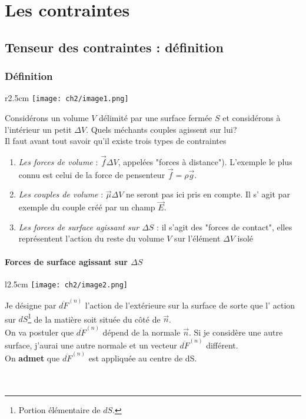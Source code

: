 
\chapter{Les contraintes}
\label{chap:ch2}

\section{Tenseur des contraintes : définition}
\subsection{Définition}
\begin{wrapfigure}[7]{r}{2.5cm}
	\texttt{[image: ch2/image1.png]}
\end{wrapfigure}
Considérons un volume $V$ délimité par une surface fermée $S$ et considérons à l'intérieur un petit
$\Delta V$. Quels méchants couples agissent sur lui?\\
Il faut avant tout savoir qu'il existe trois types de contraintes
    
\begin{enumerate}
	\item \textit{Les forces de volume} : $\vec f \Delta V$, appelées "forces à distance"). L'exemple le
	      plus connu est celui de la force de pensenteur $\vec f = \rho \vec{g}$.
	\item \textit{Les couples de volume} : $\vec{\mu}\Delta V$ ne seront pas ici pris en compte. Il s'
	      agit par exemple du couple créé par un champ $\vec{E}$.
	\item \textit{Les forces de surface agissant sur $\Delta S$} : il s'agit des "forces de contact", 
	      elles représentent l'action du reste du volume $V$ sur l'élément $\Delta V$ isolé
\end{enumerate}
        
        
\subsubsection{Forces de surface agissant sur $\Delta S$}
\begin{wrapfigure}[5]{l}{2.5cm}
	\texttt{[image: ch2/image2.png]}
\end{wrapfigure}
Je désigne par $\overline{dF}^{(n)}$ l'action de l'extérieure sur la surface de sorte que l'
action sur $dS$\footnote{Portion élémentaire de $dS$.} de la matière soit située du côté de 
$\vec{n}$.\\
On va postuler que $\overline{dF}^{(n)}$ dépend de la normale $\vec{n}$. Si je considère une 
autre surface, j'aurai une autre normale et un vecteur $\overline{dF}^{(n)}$ différent. \\
On \textbf{admet} que $\overline{dF}^{(n)}$ est appliquée au centre de dS.\\ \\ \\
        
